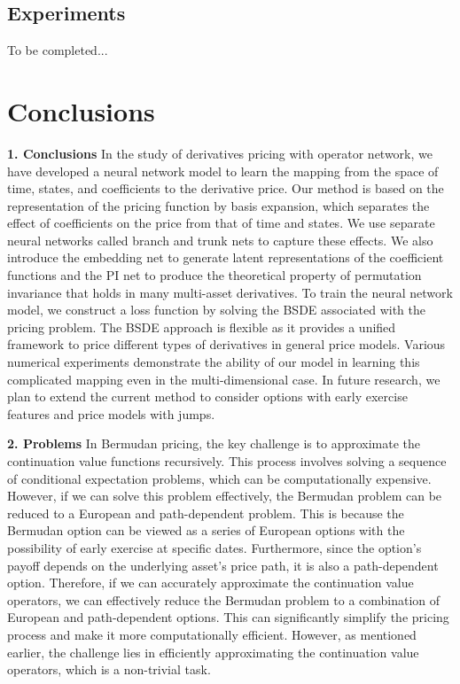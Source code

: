 \documentclass[11pt,a4paper]{article}
\theoremstyle{remark}
\begin{document}
\subsection{Experiments}
To be completed...

	
	
	
	
	\section{Conclusions}\label{sec:conclusion}
	\noindent \textbf{1. Conclusions} In the study of derivatives pricing with operator network, we have developed a neural network model to learn the mapping from the space of time, states, and coefficients to the derivative price. Our method is based on the representation of the pricing function by basis expansion, which separates the effect of coefficients on the price from that of time and states. We use separate neural networks called branch and trunk nets to capture these effects. We also introduce the embedding net to generate latent representations of the coefficient functions and the PI net to produce the theoretical property of permutation invariance that holds in many multi-asset derivatives. To train the neural network model, we construct a loss function by solving the BSDE associated with the pricing problem. The BSDE approach is flexible as it provides a unified framework to price different types of derivatives in general price models. Various numerical experiments demonstrate the ability of our model in learning this complicated mapping even in the multi-dimensional case. In future research, we plan to extend the current method to consider options with early exercise features and price models with jumps.
	
	
	\noindent \textbf{2. Problems} In Bermudan pricing, the key challenge is to approximate the continuation value functions recursively. This process involves solving a sequence of conditional expectation problems, which can be computationally expensive. However, if we can solve this problem effectively, the Bermudan problem can be reduced to a European and path-dependent problem. This is because the Bermudan option can be viewed as a series of European options with the possibility of early exercise at specific dates. Furthermore, since the option's payoff depends on the underlying asset's price path, it is also a path-dependent option. Therefore, if we can accurately approximate the continuation value operators, we can effectively reduce the Bermudan problem to a combination of European and path-dependent options. This can significantly simplify the pricing process and make it more computationally efficient. However, as mentioned earlier, the challenge lies in efficiently approximating the continuation value operators, which is a non-trivial task.
	
\end{document}
